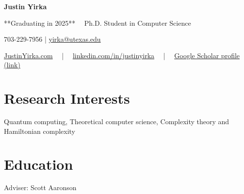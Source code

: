 \documentclass[11pt,letterpaper,serif]{moderncv}
\begin{document}
\pagestyle{normal}


\thispagestyle{firstpage}

\begin{center}
	{\LARGE\textbf{Justin Yirka}}

	**Graduating in 2025**~~ Ph.D. Student in Computer Science

	\vspace{0.5\baselineskip}

	703-229-7956 | 	\href{mailto:yirka@utexas.edu}{yirka@utexas.edu}

	\href{www.justinyirka.com}{JustinYirka.com}
	~~|~~
	\href{https://www.linkedin.com/in/justinyirka/}{linkedin.com/in/justinyirka}
	~~|~~
	\href{https://scholar.google.com/citations?user=UxIpR_UAAAAJ}{Google Scholar profile (link)}
\end{center}


\setlength{\parskip}{0em}

\section{Research Interests}
Quantum computing, Theoretical computer science, Complexity theory and Hamiltonian complexity


\section{Education}
{
	\normalsize
	\begin{adjustwidth}{.25in}{}
		Adviser: Scott Aaronson
	\end{adjustwidth}
}
{%
}
{}
\vspace{\parsep}
\end{document}
